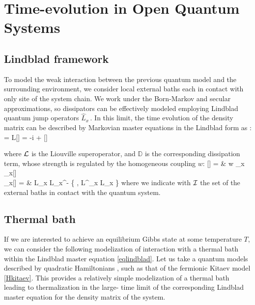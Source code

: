 \section{Time-evolution in Open Quantum Systems}


\subsection{Lindblad framework}

To model the weak interaction between the previous quantum model and the surrounding
environment, we consider local external baths each in contact with only site of the system
chain. We work under the Born-Markov and secular approximations, so dissipators 
can be effectively modeled employing Lindblad quantum jump operators $\hat L_x\,$. 
In this limit, the time evolution of the density matrix can be described by Markovian
master equations in the Lindblad form as \cite{BP-openquantumsystembook, TV-21}:
	 = {\cal L}[\rho] = 
		-i  +  \pc
\ea

where ${\cal L}$ is the Liouville superoperator, and $\mathbb{D}$ is the corresponding 
dissipation term, whose strength is regulated by the homogeneous coupling $w$:
	[\rho] = & w \sum_{x } 
		_x[\rho] \cm \\
	_x[\rho] = &
		\hat L_x \rho \hat L_x^\dagger - 
		 \Bigl\{ \rho, \hat L^\dagger_x \hat L_x \Bigl\} \pc
\ea
where we indicate with ${\cal I}$ the set of the external baths in contact with the
quantum system.

\subsection{Thermal bath}

If we are interested to achieve an equilibrium Gibbs state at some temperature $T$, we
can consider the following modelization of interaction with a thermal bath within 
the Lindblad master equation \eqref{eqlindblad}.
Let us take a  quantum models described by quadratic Hamiltonians \cite{dr2021self}, 
such as that of the fermionic Kitaev model \eqref{Hkitaev}. This provides a relatively 
simple modelization of a thermal bath leading to thermalization in the large-
time limit of the corresponding Lindblad master equation
for the density matrix of the system.

